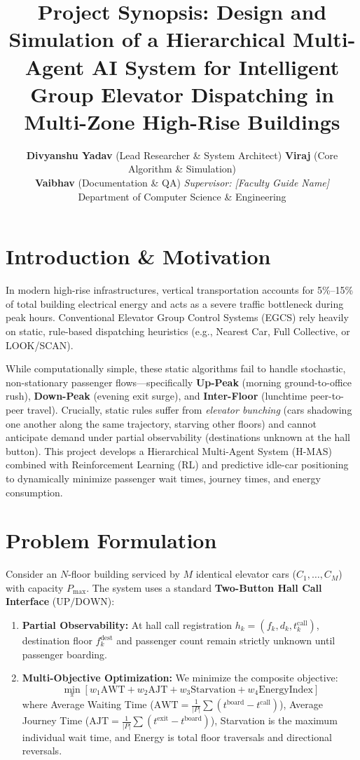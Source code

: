 \documentclass[10pt,a4paper,twocolumn]{article}
\title{\vspace{-1.5cm}\textbf{\Large Project Synopsis: Design and Simulation of a Hierarchical Multi-Agent AI System for Intelligent Group Elevator Dispatching in Multi-Zone High-Rise Buildings}}
\author{
\textbf{Divyanshu Yadav} (Lead Researcher \& System Architect) \quad
\textbf{Viraj} (Core Algorithm \& Simulation) \\
\textbf{Vaibhav} (Documentation \& QA) \quad
\textit{Supervisor: [Faculty Guide Name]} \\
Department of Computer Science \& Engineering
}
\date{}
\begin{document}
\maketitle
\vspace{-1.2cm}

\section{Introduction \& Motivation}
In modern high-rise infrastructures, vertical transportation accounts for 5\%--15\% of total building electrical energy and acts as a severe traffic bottleneck during peak hours. Conventional Elevator Group Control Systems (EGCS) rely heavily on static, rule-based dispatching heuristics (e.g., Nearest Car, Full Collective, or LOOK/SCAN). 

While computationally simple, these static algorithms fail to handle stochastic, non-stationary passenger flows—specifically \textbf{Up-Peak} (morning ground-to-office rush), \textbf{Down-Peak} (evening exit surge), and \textbf{Inter-Floor} (lunchtime peer-to-peer travel). Crucially, static rules suffer from \textit{elevator bunching} (cars shadowing one another along the same trajectory, starving other floors) and cannot anticipate demand under partial observability (destinations unknown at the hall button). This project develops a Hierarchical Multi-Agent System (H-MAS) combined with Reinforcement Learning (RL) and predictive idle-car positioning to dynamically minimize passenger wait times, journey times, and energy consumption.

\section{Problem Formulation}
Consider an $N$-floor building serviced by $M$ identical elevator cars ($C_1, \dots, C_M$) with capacity $P_{\max}$. The system uses a standard \textbf{Two-Button Hall Call Interface} ($\text{UP}/\text{DOWN}$):
\begin{enumerate}
    \item \textbf{Partial Observability:} At hall call registration $h_k = (f_k, d_k, t_k^{\text{call}})$, destination floor $f_k^{\text{dest}}$ and passenger count remain strictly unknown until passenger boarding.
    \item \textbf{Multi-Objective Optimization:} We minimize the composite objective:
    $$\min_{\pi} \left[ w_1 \text{AWT} + w_2 \text{AJT} + w_3 \text{Starvation} + w_4 \text{EnergyIndex} \right]$$
    where Average Waiting Time ($\text{AWT} = \frac{1}{|P|}\sum (t^{\text{board}} - t^{\text{call}})$), Average Journey Time ($\text{AJT} = \frac{1}{|P|}\sum (t^{\text{exit}} - t^{\text{board}})$), Starvation is the maximum individual wait time, and Energy is total floor traversals and directional reversals.
\end{enumerate}
\end{document}
